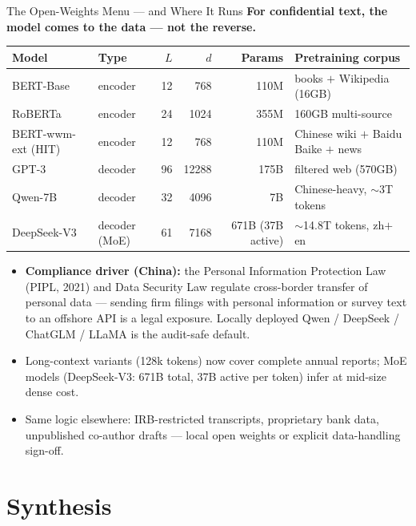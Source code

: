 \begin{frame}{The Open-Weights Menu --- and Where It Runs}
\textbf{For confidential text, the model comes to the data --- not the reverse.}
\begin{center}
\renewcommand{\arraystretch}{1.15}
\scriptsize
\begin{tabular}{l l r r r l}
\toprule
\textbf{Model} & \textbf{Type} & $L$ & $d$ & \textbf{Params} & \textbf{Pretraining corpus} \\
\midrule
BERT-Base & encoder & 12 & 768 & 110M & books $+$ Wikipedia (16GB) \\
RoBERTa & encoder & 24 & 1024 & 355M & 160GB multi-source \\
BERT-wwm-ext (HIT) & encoder & 12 & 768 & 110M & Chinese wiki $+$ Baidu Baike $+$ news \\
GPT-3 & decoder & 96 & 12288 & 175B & filtered web (570GB) \\
Qwen-7B & decoder & 32 & 4096 & 7B & Chinese-heavy, $\sim$3T tokens \\
DeepSeek-V3 & decoder (MoE) & 61 & 7168 & 671B (37B active) & $\sim$14.8T tokens, zh$+$en \\
\bottomrule
\end{tabular}
\end{center}
\begin{itemize}
\item \textbf{Compliance driver (China):} the Personal Information Protection Law (PIPL, 2021) and Data Security Law regulate cross-border transfer of personal data --- sending firm filings with personal information or survey text to an offshore API is a legal exposure. Locally deployed Qwen / DeepSeek / ChatGLM / LLaMA is the audit-safe default.
\item Long-context variants (128k tokens) now cover complete annual reports; MoE models (DeepSeek-V3: 671B total, 37B active per token) infer at mid-size dense cost.
\item Same logic elsewhere: IRB-restricted transcripts, proprietary bank data, unpublished co-author drafts --- local open weights or explicit data-handling sign-off.
\end{itemize}
\end{frame}

\section{Synthesis}

